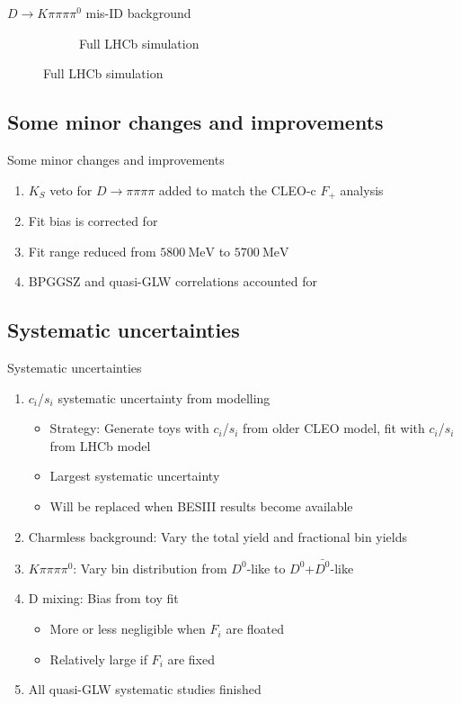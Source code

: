 \documentclass{beamer}
\begin{document}
\begin{frame}{$D\to K\pi\pi\pi\pi^0$ mis-ID background}
\begin{figure}
\begin{subfigure}{0.50\textwidth}
      \caption{Full LHCb simulation}
    \end{subfigure}
  \end{figure}
\end{frame}

\subsection{Some minor changes and improvements}
\begin{frame}{Some minor changes and improvements}
  \begin{enumerate}
    \setlength\itemsep{1.5em}
    \item{$K_S$ veto for $D\to\pi\pi\pi\pi$ added to match the CLEO-c $F_+$ analysis}
    \item{Fit bias is corrected for}
    \item{Fit range reduced from $\SI{5800}{\mega\eV}$ to $\SI{5700}{\mega\eV}$}
    \item{BPGGSZ and quasi-GLW correlations accounted for}
  \end{enumerate}
\end{frame}

\subsection{Systematic uncertainties}
\begin{frame}{Systematic uncertainties}
  \begin{enumerate}
    \setlength\itemsep{1.0em}
    \item{$c_i$/$s_i$ systematic uncertainty from modelling}
    \begin{itemize}
      \item{Strategy: Generate toys with $c_i$/$s_i$ from older CLEO model, fit with $c_i$/$s_i$ from LHCb model}
      \item{Largest systematic uncertainty}
      \item{Will be replaced when BESIII results become available}
    \end{itemize}
    \item{Charmless background: Vary the total yield and fractional bin yields}
    \item{$K\pi\pi\pi\pi^0$: Vary bin distribution from $D^0$-like to $D^0$+$\bar{D^0}$-like}
    \item{D mixing: Bias from toy fit}
    \begin{itemize}
      \item{More or less negligible when $F_i$ are floated}
      \item{Relatively large if $F_i$ are fixed}
    \end{itemize}
    \item{All quasi-GLW systematic studies finished}
  \end{enumerate}
\end{frame}
\end{document}
